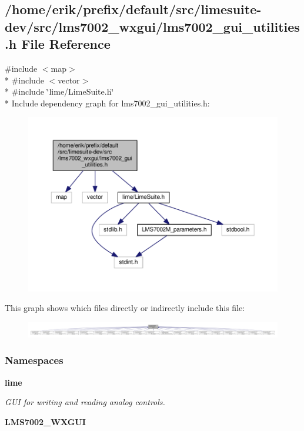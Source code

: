 \subsection{/home/erik/prefix/default/src/limesuite-\/dev/src/lms7002\+\_\+wxgui/lms7002\+\_\+gui\+\_\+utilities.h File Reference}
\label{lms7002__gui__utilities_8h}
{\ttfamily \#include $<$map$>$}\\*
{\ttfamily \#include $<$vector$>$}\\*
{\ttfamily \#include \char`\"{}lime/\+Lime\+Suite.\+h\char`\"{}}\\*
Include dependency graph for lms7002\+\_\+gui\+\_\+utilities.\+h\+:
\nopagebreak
\begin{figure}[H]
\begin{center}
\leavevmode
\includegraphics[width=350pt]{d4/de5/lms7002__gui__utilities_8h__incl}
\end{center}
\end{figure}
This graph shows which files directly or indirectly include this file\+:
\nopagebreak
\begin{figure}[H]
\begin{center}
\leavevmode
\includegraphics[width=350pt]{d4/dec/lms7002__gui__utilities_8h__dep__incl}
\end{center}
\end{figure}
\subsubsection*{Namespaces}
\begin{DoxyCompactItemize}
\item 
 {\bf lime}
\begin{DoxyCompactList}\small\item\em G\+UI for writing and reading analog controls. \end{DoxyCompactList}\item 
 {\bf L\+M\+S7002\+\_\+\+W\+X\+G\+UI}
\end{DoxyCompactItemize}

